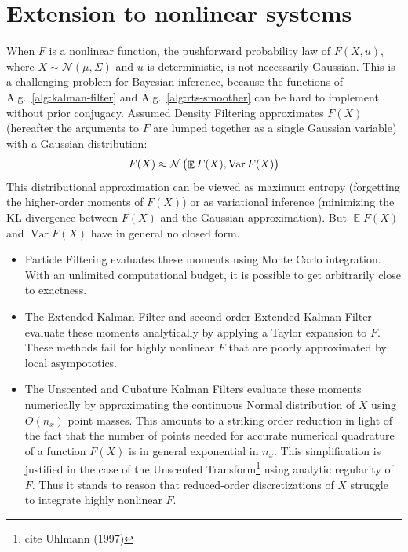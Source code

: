 \documentclass[oneside, article]{memoir}
\DeclareMathOperator{\expect}{\mathbb{E}}
\DeclareMathOperator{\Var}{\operatorname{Var}}
\begin{document}
\section{Extension to nonlinear systems}
When \(F\) is a nonlinear function, the pushforward probability law
of \(F(X, u)\), where \(X \sim \mathcal{N}(\mu, \Sigma)\) and \(u\)
is deterministic, is not necessarily Gaussian.
This is a challenging problem for Bayesian inference, because the
 functions of Alg.~\ref{alg:kalman-filter} and
Alg.~\ref{alg:rts-smoother} can be hard to implement without prior conjugacy.
Assumed Density Filtering approximates \(F(X)\) (hereafter the
arguments to \(F\) are lumped together as a single Gaussian variable)
with a Gaussian distribution:
\begin{align*}
  F(X)
  \approx \mathcal{N}\del{\expect F(X), \Var F(X)}
\end{align*}
This distributional approximation can be viewed as maximum entropy
(forgetting the higher-order moments of \(F(X)\)) or as variational
inference (minimizing the KL divergence between \(F(X)\) and the
Gaussian approximation).
But \(\expect F(X)\) and \(\Var F(X)\) have in general no closed form.
\begin{itemize}
  \item Particle Filtering evaluates these moments using Monte Carlo
    integration.
    With an unlimited computational budget, it is possible to get
    arbitrarily close to exactness.
  \item The Extended Kalman Filter and second-order Extended Kalman
    Filter evaluate these moments analytically by applying a Taylor
    expansion to \(F\).
    These methods fail for highly nonlinear \(F\) that are poorly
    approximated by local asympototics.
  \item The Unscented and Cubature Kalman Filters evaluate these
    moments numerically by approximating the continuous Normal
    distribution of \(X\) using \(O(n_x)\) point masses.
    This amounts to a striking order reduction in light of the fact
    that the number of points needed for accurate numerical
    quadrature of a function \(F(X)\) is in general exponential in \(n_x\).
    This simplification is justified in the case of the Unscented
    Transform\footnote{cite Uhlmann (1997)} using analytic regularity of \(F\).
    Thus it stands to reason that reduced-order discretizations of
    \(X\) struggle to integrate highly nonlinear \(F\).
\end{itemize}
\end{document}
